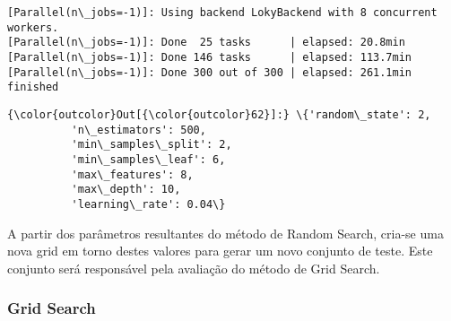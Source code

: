 \documentclass[11pt]{article}
\begin{document}
    \begin{Verbatim}[commandchars=\\\{\}]
[Parallel(n\_jobs=-1)]: Using backend LokyBackend with 8 concurrent workers.
[Parallel(n\_jobs=-1)]: Done  25 tasks      | elapsed: 20.8min
[Parallel(n\_jobs=-1)]: Done 146 tasks      | elapsed: 113.7min
[Parallel(n\_jobs=-1)]: Done 300 out of 300 | elapsed: 261.1min finished

    \end{Verbatim}

\begin{Verbatim}[commandchars=\\\{\}]
{\color{outcolor}Out[{\color{outcolor}62}]:} \{'random\_state': 2,
          'n\_estimators': 500,
          'min\_samples\_split': 2,
          'min\_samples\_leaf': 6,
          'max\_features': 8,
          'max\_depth': 10,
          'learning\_rate': 0.04\}
\end{Verbatim}
            
    A partir dos parâmetros resultantes do método de Random Search, cria-se
uma nova grid em torno destes valores para gerar um novo conjunto de
teste. Este conjunto será responsável pela avaliação do método de Grid
Search.

    \hypertarget{grid-search}{%
\subsubsection{Grid Search}\label{grid-search}}
\end{document}
